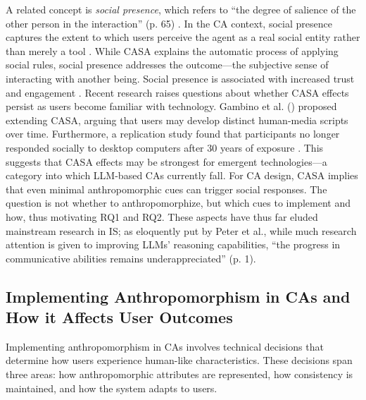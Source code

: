 \documentclass[manuscript,anonymous,sigconf]{acmart}
\begin{document}
A related concept is \textit{social presence}, which refers to ``the degree of salience of the other person in the interaction'' (p. 65) \citep{short1976social}. In the CA context, social presence captures the extent to which users perceive the agent as a real social entity rather than merely a tool \citep{oh2018systematic}. While CASA explains the automatic process of applying social rules, social presence addresses the outcome---the subjective sense of interacting with another being. Social presence is associated with increased trust and engagement \citep{gunawardena1995social}. Recent research raises questions about whether CASA effects persist as users become familiar with technology. Gambino et al. (\citeyear{gambino2020building}) proposed extending CASA, arguing that users may develop distinct human-media scripts over time. Furthermore, a replication study found that participants no longer responded socially to desktop computers after 30 years of exposure \citep{koger2023casa}. This suggests that CASA effects may be strongest for emergent technologies---a category into which LLM-based CAs currently fall. For CA design, CASA implies that even minimal anthropomorphic cues can trigger social responses. The question is not whether to anthropomorphize, but which cues to implement and how, thus motivating RQ1 and RQ2. These aspects have thus far eluded mainstream research in IS; as eloquently put by Peter et al., while much research attention is given to improving LLMs' reasoning capabilities, ``the progress in communicative abilities remains underappreciated'' (p. 1).




\subsection{Implementing Anthropomorphism in CAs and How it Affects User Outcomes}
Implementing anthropomorphism in CAs involves technical decisions that determine how users experience human-like characteristics. These decisions span three areas: how anthropomorphic attributes are represented, how consistency is maintained, and how the system adapts to users.
\end{document}

